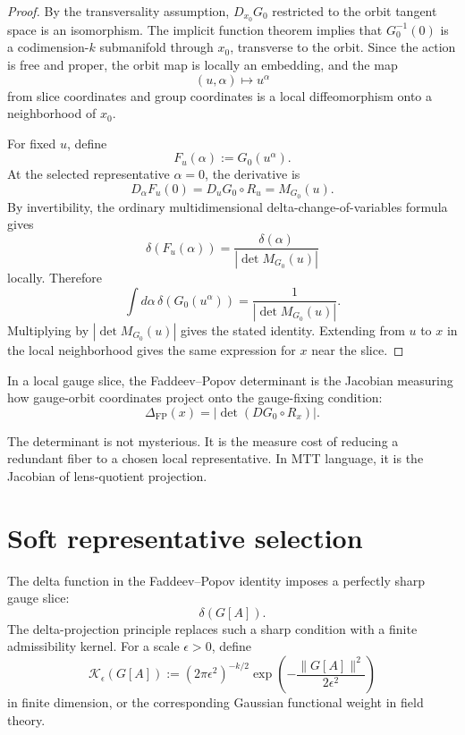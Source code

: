 \documentclass[11pt]{article}
\newcommand{\FP}{\mathrm{FP}}
\begin{document}
\begin{proof}
By the transversality assumption, \(D_{x_0}G_0\) restricted to the orbit tangent space is an isomorphism. The implicit function theorem implies that \(G_0^{-1}(0)\) is a codimension-\(k\) submanifold through \(x_0\), transverse to the orbit. Since the action is free and proper, the orbit map is locally an embedding, and the map
\[
(u,\alpha)\mapsto u^\alpha
\]
from slice coordinates and group coordinates is a local diffeomorphism onto a neighborhood of \(x_0\).

For fixed \(u\), define
\[
F_u(\alpha):=G_0(u^\alpha).
\]
At the selected representative \(\alpha=0\), the derivative is
\[
D_\alpha F_u(0)=D_uG_0\circ R_u=M_{G_0}(u).
\]
By invertibility, the ordinary multidimensional delta-change-of-variables formula gives
\[
\delta(F_u(\alpha))
=
\frac{\delta(\alpha)}{|\det M_{G_0}(u)|}
\]
locally. Therefore
\[
\int d\alpha\,\delta(G_0(u^\alpha))
=
\frac{1}{|\det M_{G_0}(u)|}.
\]
Multiplying by \(|\det M_{G_0}(u)|\) gives the stated identity. Extending from \(u\) to \(x\) in the local neighborhood gives the same expression for \(x\) near the slice. \end{proof}

\begin{corollary}
In a local gauge slice, the Faddeev--Popov determinant is the Jacobian measuring how gauge-orbit coordinates project onto the gauge-fixing condition:
\[
\Delta_{\FP}(x)=|\det(DG_0\circ R_x)|.
\]
\end{corollary}

\begin{remark}
The determinant is not mysterious. It is the measure cost of reducing a redundant fiber to a chosen local representative. In MTT language, it is the Jacobian of lens-quotient projection.
\end{remark}

\section{Soft representative selection}

The delta function in the Faddeev--Popov identity imposes a perfectly sharp gauge slice:
\[
\delta(G[A]).
\]
The delta-projection principle replaces such a sharp condition with a finite admissibility kernel. For a scale \(\epsilon>0\), define
\[
\mathcal K_\epsilon(G[A])
:=
(2\pi\epsilon^2)^{-k/2}
\exp\left(-\frac{\|G[A]\|^2}{2\epsilon^2}\right)
\]
in finite dimension, or the corresponding Gaussian functional weight in field theory.
\end{document}
